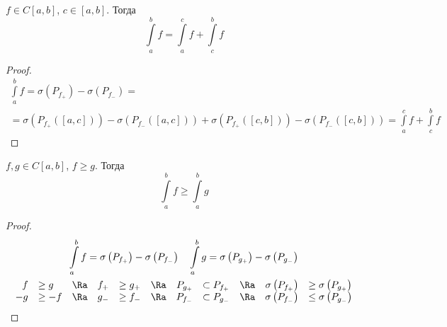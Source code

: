 \begin{theorem}
	$f \in C[a, b]$, $c \in [a, b]$.
	Тогда
	\[ \int\limits_a^b f = \int\limits_a^c f + \int\limits_c^b f \]
\end{theorem}
\begin{proof}
	\begin{gather*}
		\int\limits_a^b f = \sigma\left(P_{f_+}\right) - \sigma\left(P_{f_-}\right) = \\
		= \sigma\left(P_{f_+}([a, c])\right) - \sigma \left(P_{f_-}([a, c])\right)
			+ \sigma \left(P_{f_+}([c, b])\right) - \sigma \left(P_{f_-}([c, b])\right) =
			\int\limits_a^c f + \int\limits_c^b f
	\end{gather*}
\end{proof}

\begin{theorem}
	$f, g \in C[a, b]$, $f \ge g$.
	Тогда
	\[ \int\limits_a^b f \ge \int\limits_a^b g \]
\end{theorem}
\begin{proof}
	\begin{gather*}
		\int\limits_a^b f = \sigma\left(P_{f_+}\right) - \sigma\left(P_{f_-}\right) \quad
		\int\limits_a^b g = \sigma\left(P_{g_+}\right) - \sigma\left(P_{g_-}\right) \\
		\begin{array}{rlcrlcrlcrl}
			 f &\ge  g &\Ra& f_+ &\ge g_+ &\Ra& P_{g_+} &\subset P_{f_+} &\Ra& \sigma\left(P_{f_+}\right) &\ge \sigma\left(P_{g_+}\right) \\
			-g &\ge -f &\Ra& g_- &\ge f_- &\Ra& P_{f_-} &\subset P_{g_-} &\Ra& \sigma\left(P_{f_-}\right) &\le \sigma\left(P_{g_-}\right)
		\end{array}
	\end{gather*}
\end{proof}
